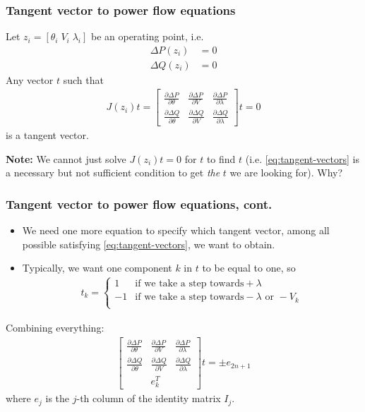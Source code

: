 \documentclass{beamer}
\begin{document}
\begin{frame}
  \frametitle{Tangent vector to power flow equations}
  Let $z_i = [\theta_i \; V_i \; \lambda_{i}]$ be an operating point, i.e.
  \begin{align}
    \label{eq:7}
    \Delta P (z_i) &= 0 \\
    \Delta Q (z_i) &= 0
  \end{align}
Any vector $t$ such that
\begin{align}
  \label{eq:tangent-vectors}
  J(z_i)t = \begin{bmatrix}
  \frac{\partial \Delta P}{\partial \theta} & \frac{\partial \Delta P}{\partial V} & \frac{\partial \Delta P}{\partial \lambda} \\
  \frac{\partial \Delta Q}{\partial \theta} & \frac{\partial \Delta Q}{\partial V} & \frac{\partial \Delta Q}{\partial \lambda}
  \end{bmatrix} t = 0
\end{align}
is a tangent vector.

\textbf{Note:} We cannot just solve $J(z_i) t = 0$ for $t$ to find $t$ (i.e. \eqref{eq:tangent-vectors} is a necessary but not sufficient condition to get \emph{the} $t$ we are looking for). Why? 
\end{frame}

\begin{frame}
  \frametitle{Tangent vector to power flow equations, cont.}
  \begin{itemize}
  \item We need one more equation to specify which tangent vector, among all possible satisfying \eqref{eq:tangent-vectors}, we want to obtain.
  \item Typically, we want one component $k$ in $t$ to be equal to one, so 
    \begin{align}
      \label{eq:10}
      t_k = \begin{cases}
1 & \text{if we take a step towards} +\lambda \\
-1 & \text{if we take a step towards} -\lambda \text{ or } -V_k \\
      \end{cases}
    \end{align}
  \end{itemize}
 Combining everything:
\begin{align}
  \begin{bmatrix}
  \frac{\partial \Delta P}{\partial \theta} & \frac{\partial \Delta P}{\partial V} & \frac{\partial \Delta P}{\partial \lambda} \\
  \frac{\partial \Delta Q}{\partial \theta} & \frac{\partial \Delta Q}{\partial V} & \frac{\partial \Delta Q}{\partial \lambda} \\
   & e_k^T & 
  \end{bmatrix} t = \pm e_{2n+1}
\end{align}
where $e_j$ is the $j$-th column of the identity matrix $I_{j}$.
\end{frame}
\end{document}
